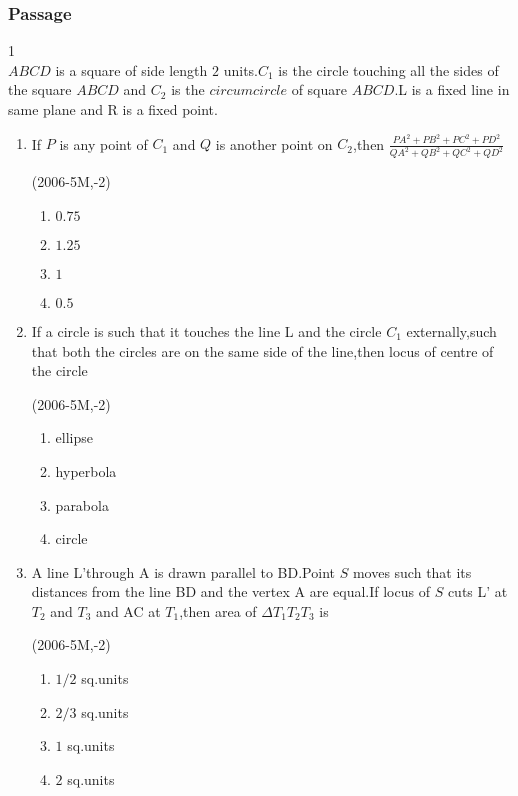 \documentclass[journal]{IEEEtran}
\numberwithin{equation}{enumi}
\numberwithin{figure}{enumi}
\begin{document}
\subsubsection{Passage }
1\\
$ABCD$ is a square of side length $2$ units.$C_1$ is the circle touching all the sides of the square $ABCD$ and $C_2$ is the $circumcircle$ of square $ABCD$.L is a fixed line in same plane and R is a fixed point.\\
\begin{enumerate}
\item If $P$ is any point of $C_1$ and $Q$ is another point on $C_2$,then $\frac{PA^2+PB^2+PC^2+PD^2}{QA^2+QB^2+QC^2+QD^2}$

\hfill(2006-5M,-2)
\begin{enumerate}
\item $0.75$
\item $1.25$
\item $1$
\item $0.5$
\end{enumerate}
\item If a circle is such that it touches the line L and the circle $C_1$ externally,such that both the circles are on the same side of the line,then locus of centre of the circle 

\hfill(2006-5M,-2)
\begin{enumerate}
\item ellipse
\item hyperbola
\item parabola
\item circle
\end{enumerate}
\item A line L'through A is drawn parallel to BD.Point $S$ moves such that its distances from the line BD and the vertex A are equal.If locus of $S$ cuts L' at $T_2$ and $T_3$ and AC at $T_1$,then area of $\Delta T_1T_2T_3$ is

\hfill(2006-5M,-2)
\begin{enumerate}
\item $1/2$ sq.units
\item $2/3$ sq.units
\item $1$ sq.units
\item $2$ sq.units
\end{enumerate}


\end{enumerate}
\end{document}
